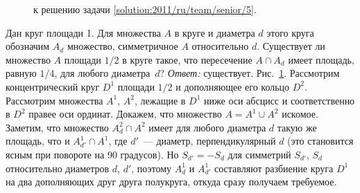 \ifsolution
\begin{figure}\centering
    \caption{к решению задачи \ref{solution:2011/ru/team/senior/5}.}
    \label{fig:solution:2011/ru/team/senior/5}
\end{figure}%
\fi %

\problem{}
Дан круг площади 1.
Для множества $A$ в круге и диаметра $d$ этого круга обозначим $A_d$ множество,
симметричное $A$ относительно $d$.
Существует ли множество $A$ площади $1 / 2$ в круге такое, что пересечение
$A \cap A_d$ имеет площадь, равную $1/4$, для любого диаметра~$d$?
\solution
\label{solution:2011/ru/team/senior/5}%
\emph{Ответ:} существует.
Рис.~\ref{fig:solution:2011/ru/team/senior/5}.
Рассмотрим концентрический круг $D^1$ площади $1 / 2$ и дополняющее его кольцо
$D^2$.
Рассмотрим множества $A^1$, $A^2$, лежащие в $D^1$ ниже оси абсцисс и
соответственно в $D^2$ правее оси ординат.
Докажем, что множество $A = A^1 \cup A^2$ искомое.
Заметим, что множество $A^2_d \cap A^2$ имеет для любого диаметра $d$ такую же
площадь, что и $A^1_{d'} \cap A^1$, где $d'$~--- диаметр, перпендикулярный $d$
(это становится ясным при повороте на 90 градусов).
Но $S_{d'} = -S_d$ для симметрий $S_{d'}$, $S_d$ относительно диаметров $d$,
$d'$, поэтому $A^1_d$ и $A^1_{d'}$ составляют разбиение круга $D^1$ на два
дополняющих друг друга полукруга, откуда сразу получаем требуемое.
\endproblem
